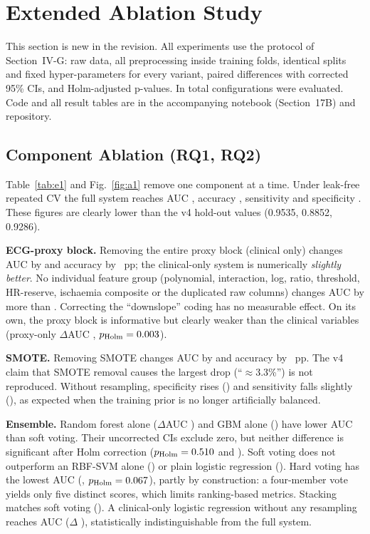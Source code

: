 \section{Extended Ablation Study}
This section is new in the revision. All experiments use the protocol of Section~IV-G: raw data, all preprocessing inside training folds, identical splits and fixed hyper-parameters for every variant, paired differences with corrected 95\% CIs, and Holm-adjusted p-values. In total \nVariants{} configurations were evaluated. Code and all result tables are in the accompanying notebook (Section~17B) and repository.



\subsection{Component Ablation (RQ1, RQ2)}
Table~\ref{tab:e1} and Fig.~\ref{fig:a1} remove one component at a time. Under leak-free repeated CV the full system reaches AUC \fullAUC{} \fullAUCci{}, accuracy \fullAcc{}, sensitivity \fullSens{} and specificity \fullSpec{}. These figures are clearly lower than the v4 hold-out values (0.9535, 0.8852, 0.9286).

\textbf{ECG-proxy block.} Removing the entire proxy block (clinical only) changes AUC by \dClinAUC{} and accuracy by \dClinAcc{}~pp; the clinical-only system is numerically \emph{slightly better}. No individual feature group (polynomial, interaction, log, ratio, threshold, HR-reserve, ischaemia composite or the duplicated raw columns) changes AUC by more than \engMaxAbs{}. Correcting the ``downslope'' coding has no measurable effect. On its own, the proxy block is informative but clearly weaker than the clinical variables (proxy-only $\Delta$AUC \dProxyOnlyAUC{}, $p_{\text{Holm}}=0.003{}$).

\textbf{SMOTE.} Removing SMOTE changes AUC by \dNoSmoteAUC{} and accuracy by \dNoSmoteAcc{}~pp. The v4 claim that SMOTE removal causes the largest drop (``$\approx$3.3\%'') is not reproduced. Without resampling, specificity rises (\noSmoteSpec{}) and sensitivity falls slightly (\noSmoteSens{}), as expected when the training prior is no longer artificially balanced.

\textbf{Ensemble.} Random forest alone ($\Delta$AUC \dRfOnlyAUC{}) and GBM alone (\dGbmOnlyAUC{}) have lower AUC than soft voting. Their uncorrected CIs exclude zero, but neither difference is significant after Holm correction ($p_{\text{Holm}}=0.510{}$ and \pGbmOnly{}). Soft voting does not outperform an RBF-SVM alone (\dSvmOnlyAUC{}) or plain logistic regression (\dLRAUC{}). Hard voting has the lowest AUC (\dHardAUC{}, $p_{\text{Holm}}=0.067{}$), partly by construction: a four-member vote yields only five distinct scores, which limits ranking-based metrics. Stacking matches soft voting (\dStackAUC{}). A clinical-only logistic regression without any resampling reaches AUC \clinLRAUCval{} ($\Delta$ \dClinLRAUC{}), statistically indistinguishable from the full system.

